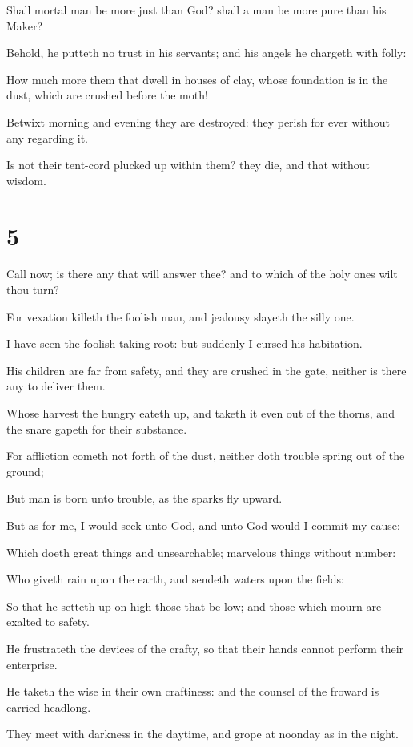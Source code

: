 \documentclass[12pt,oneside]{book}
\begin{document}
Shall mortal man be more just than God? shall a man be more pure than his Maker?

Behold, he putteth no trust in his servants; and his angels he chargeth with folly:

How much more them that dwell in houses of clay, whose foundation is in the dust, which are crushed before the moth!

Betwixt morning and evening they are destroyed: they perish for ever without any regarding it.

Is not their tent-cord plucked up within them? they die, and that without wisdom.


\chapter{5}
Call now; is there any that will answer thee? and to which of the holy ones wilt thou turn?

For vexation killeth the foolish man, and jealousy slayeth the silly one.

I have seen the foolish taking root: but suddenly I cursed his habitation.

His children are far from safety, and they are crushed in the gate, neither is there any to deliver them.

Whose harvest the hungry eateth up, and taketh it even out of the thorns, and the snare gapeth for their substance.

For affliction cometh not forth of the dust, neither doth trouble spring out of the ground;

But man is born unto trouble, as the sparks fly upward.

But as for me, I would seek unto God, and unto God would I commit my cause:

Which doeth great things and unsearchable; marvelous things without number:

Who giveth rain upon the earth, and sendeth waters upon the fields:

So that he setteth up on high those that be low; and those which mourn are exalted to safety.

He frustrateth the devices of the crafty, so that their hands cannot perform their enterprise.

He taketh the wise in their own craftiness: and the counsel of the froward is carried headlong.

They meet with darkness in the daytime, and grope at noonday as in the night.
\end{document}
